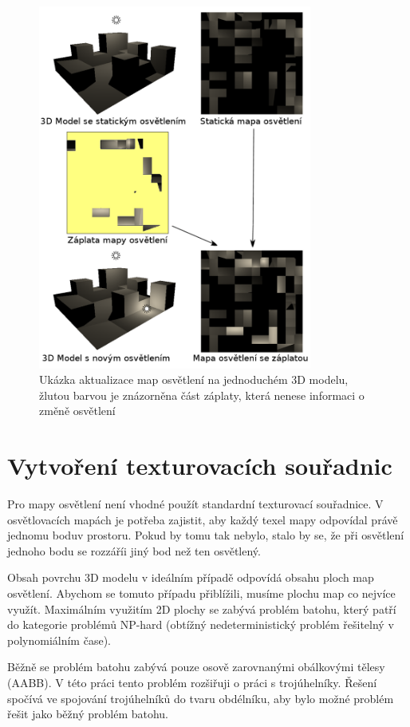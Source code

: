 \documentclass[11pt,twoside,a4paper]{book}
\begin{document}
\begin{center}
\begin{figure}[h!]
\includegraphics[width=90mm]{figures/lmupdate.png}
\caption{Ukázka aktualizace map osvětlení na jednoduchém 3D modelu, žlutou barvou je znázorněna část záplaty, která nenese informaci o změně osvětlení}
\end{figure}
\end{center}
\newpage

\section{Vytvoření texturovacích souřadnic}
Pro mapy osvětlení není vhodné použít standardní texturovací souřadnice. V osvětlovacích mapách je potřeba zajistit, aby každý texel mapy odpovídal právě jednomu bodu\linebreak v prostoru. Pokud by tomu tak nebylo, stalo by se, že při osvětlení jednoho bodu se rozzáří\linebreak i jiný bod než ten osvětlený.

Obsah povrchu 3D modelu v ideálním případě odpovídá obsahu ploch map osvětlení. Abychom se tomuto případu přiblížili, musíme plochu map co nejvíce využít. Maximálním využitím 2D plochy se zabývá problém batohu, který patří do kategorie problémů NP-hard (obtížný nedeterministický problém řešitelný v polynomiálním čase).

Běžně se problém batohu zabývá pouze osově zarovnanými obálkovými tělesy (AABB). V této práci tento problém rozšiřuji o práci s trojúhelníky. Řešení spočívá ve spojování trojúhelníků do tvaru obdélníku, aby bylo možné problém řešit jako běžný problém batohu.
\end{document}
